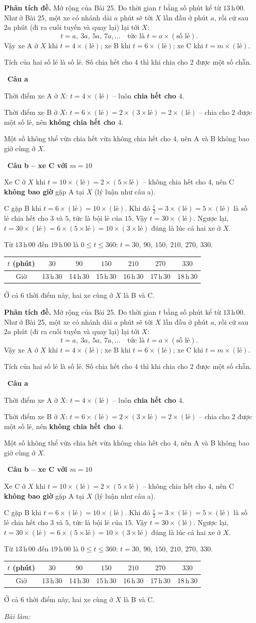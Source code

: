 \documentclass[11pt]{article}
\newif\ifsol \soltrue
\newcommand{\StuProb}[2]{\begin{probboxS}{#1}{#2}\StuProbBody\end{probboxS}}
\newcommand{\probsol}[1]{%
  \begin{lrbox}{\solmeasure}\begin{minipage}{\dimexpr\linewidth-24pt\relax}#1\end{minipage}\end{lrbox}%
  \ifsol
    \begin{solbox}#1\end{solbox}%
  \else
    \setlength{\solht}{\dimexpr\ht\solmeasure+\dp\solmeasure+0.85cm\relax}%
    \ifdim\solht<1.35cm\setlength{\solht}{1.35cm}\fi
    \ifdim\solht>\StudentMaxWork\setlength{\solht}{\StudentMaxWork}\fi
    \par\noindent\begin{minipage}{\linewidth}%
    \expandafter\StuProb\StuProbArgs
    \begin{tcolorbox}[colback=white,colframe=Line,boxrule=0.8pt,arc=5pt,
      left=8pt,right=8pt,top=4pt,bottom=4pt,height=\solht]{\footnotesize\color{Slate}\itshape\WorkWord}\end{tcolorbox}%
    \end{minipage}\par\medskip
  \fi}
\newlength{\StudentMaxWork}\setlength{\StudentMaxWork}{4.5cm}
\newcommand{\step}[2]{\par\smallskip\noindent{\bfseries\color{tmBlue!85!black}\StepWord~#1.}\ {\bfseries #2}\par\nopagebreak}
\def\WorkWord{Bài làm:}
\def\StepWord{Bước}
\begin{document}
\probsol{
\textbf{Phân tích đề.} Mở rộng của Bài 25. Đo thời gian $t$ bằng số phút kể từ $13$\,h\,$00$. Như ở Bài 25, một xe có nhánh dài $a$ phút sẽ tới $X$ lần đầu ở phút $a$, rồi cứ sau $2a$ phút (đi ra cuối tuyến và quay lại) lại tới $X$:
\[ t=a,\ 3a,\ 5a,\ 7a,\dots \quad\text{tức là } t=a\times(\text{số lẻ}). \]
Vậy xe A ở $X$ khi $t=4\times(\text{lẻ})$; xe B khi $t=6\times(\text{lẻ})$; xe C khi $t=m\times(\text{lẻ})$.
\begin{recallbox}Tích của hai số lẻ là số lẻ. Số chia hết cho $4$ thì khi chia cho $2$ được một số chẵn.\end{recallbox}

\step{1}{Câu a}
Thời điểm xe A ở $X$: $t=4\times(\text{lẻ})$ -- luôn \textbf{chia hết cho $4$}.\par
Thời điểm xe B ở $X$: $t=6\times(\text{lẻ})=2\times(3\times\text{lẻ})=2\times(\text{lẻ})$ -- chia cho $2$ được một số lẻ, nên \textbf{không chia hết cho $4$}.\par
Một số không thể vừa chia hết vừa không chia hết cho $4$, nên A và B không bao giờ cùng ở $X$.

\step{2}{Câu b -- xe C với $m=10$}
Xe C ở $X$ khi $t=10\times(\text{lẻ})=2\times(5\times\text{lẻ})$ -- không chia hết cho $4$, nên C \textbf{không bao giờ} gặp A tại $X$ (lý luận như câu a).\par
C gặp B khi $t=6\times(\text{lẻ})=10\times(\text{lẻ})$. Khi đó $\frac{t}{2}=3\times(\text{lẻ})=5\times(\text{lẻ})$ là số lẻ chia hết cho $3$ và $5$, tức là bội lẻ của $15$. Vậy $t=30\times(\text{lẻ})$. Ngược lại, $t=30\times(\text{lẻ})=6\times(5\times\text{lẻ})=10\times(3\times\text{lẻ})$ đúng là lúc cả hai xe ở $X$.\par
Từ $13$\,h\,$00$ đến $19$\,h\,$00$ là $0\le t\le 360$: $t=30,\ 90,\ 150,\ 210,\ 270,\ 330$.
\begin{center}
\begin{tabular}{|c|c|c|c|c|c|c|}
\hline
\rowcolor{tmBlue!10}$t$ (phút) & $30$ & $90$ & $150$ & $210$ & $270$ & $330$\\ \hline
Giờ & 13\,h\,30 & 14\,h\,30 & 15\,h\,30 & 16\,h\,30 & 17\,h\,30 & 18\,h\,30\\ \hline
\end{tabular}
\end{center}
Ở cả $6$ thời điểm này, hai xe cùng ở $X$ là B và C.

}
\end{document}
